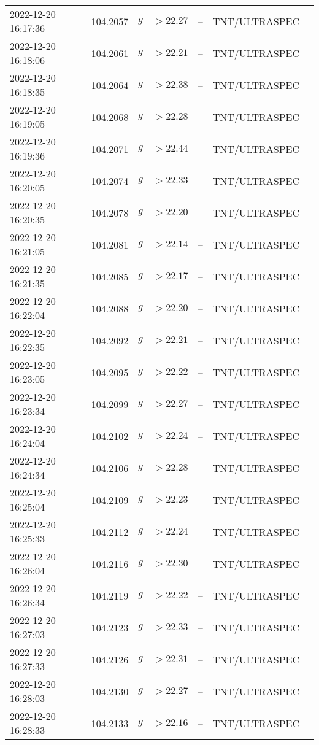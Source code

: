 \documentclass{nature_plusfigure}
\begin{document}
\begin{supplement}
\begin{center}
\begin{longtable}{lllllll}
2022-12-20 16:17:36 & 104.2057 & $g$ & $>22.27$ & -- & TNT/ULTRASPEC &  \\ 
2022-12-20 16:18:06 & 104.2061 & $g$ & $>22.21$ & -- & TNT/ULTRASPEC &  \\ 
2022-12-20 16:18:35 & 104.2064 & $g$ & $>22.38$ & -- & TNT/ULTRASPEC &  \\ 
2022-12-20 16:19:05 & 104.2068 & $g$ & $>22.28$ & -- & TNT/ULTRASPEC &  \\ 
2022-12-20 16:19:36 & 104.2071 & $g$ & $>22.44$ & -- & TNT/ULTRASPEC &  \\ 
2022-12-20 16:20:05 & 104.2074 & $g$ & $>22.33$ & -- & TNT/ULTRASPEC &  \\ 
2022-12-20 16:20:35 & 104.2078 & $g$ & $>22.20$ & -- & TNT/ULTRASPEC &  \\ 
2022-12-20 16:21:05 & 104.2081 & $g$ & $>22.14$ & -- & TNT/ULTRASPEC &  \\ 
2022-12-20 16:21:35 & 104.2085 & $g$ & $>22.17$ & -- & TNT/ULTRASPEC &  \\ 
2022-12-20 16:22:04 & 104.2088 & $g$ & $>22.20$ & -- & TNT/ULTRASPEC &  \\ 
2022-12-20 16:22:35 & 104.2092 & $g$ & $>22.21$ & -- & TNT/ULTRASPEC &  \\ 
2022-12-20 16:23:05 & 104.2095 & $g$ & $>22.22$ & -- & TNT/ULTRASPEC &  \\ 
2022-12-20 16:23:34 & 104.2099 & $g$ & $>22.27$ & -- & TNT/ULTRASPEC &  \\ 
2022-12-20 16:24:04 & 104.2102 & $g$ & $>22.24$ & -- & TNT/ULTRASPEC &  \\ 
2022-12-20 16:24:34 & 104.2106 & $g$ & $>22.28$ & -- & TNT/ULTRASPEC &  \\ 
2022-12-20 16:25:04 & 104.2109 & $g$ & $>22.23$ & -- & TNT/ULTRASPEC &  \\ 
2022-12-20 16:25:33 & 104.2112 & $g$ & $>22.24$ & -- & TNT/ULTRASPEC &  \\ 
2022-12-20 16:26:04 & 104.2116 & $g$ & $>22.30$ & -- & TNT/ULTRASPEC &  \\ 
2022-12-20 16:26:34 & 104.2119 & $g$ & $>22.22$ & -- & TNT/ULTRASPEC &  \\ 
2022-12-20 16:27:03 & 104.2123 & $g$ & $>22.33$ & -- & TNT/ULTRASPEC &  \\ 
2022-12-20 16:27:33 & 104.2126 & $g$ & $>22.31$ & -- & TNT/ULTRASPEC &  \\ 
2022-12-20 16:28:03 & 104.2130 & $g$ & $>22.27$ & -- & TNT/ULTRASPEC &  \\ 
2022-12-20 16:28:33 & 104.2133 & $g$ & $>22.16$ & -- & TNT/ULTRASPEC &  \\ 

\end{longtable}
\end{center}
\end{supplement}
\end{document}
